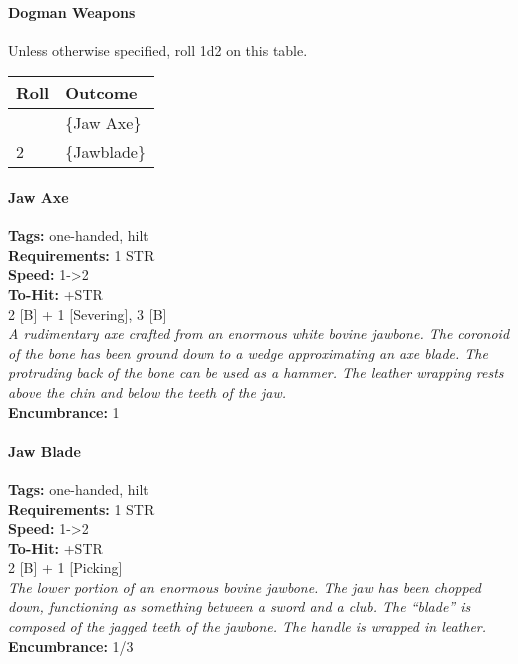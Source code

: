 \documentclass[
  letterpaper,
  DIV=11,
  numbers=noendperiod]{scrartcl}
\let\oldparagraph\paragraph
\renewcommand{\paragraph}[1]{\oldparagraph{#1}\mbox{}}
\begin{document}
\paragraph{Dogman Weapons}\label{dogman-weapons}

Unless otherwise specified, roll 1d2 on this table.

\begin{longtable}[]{@{}ll@{}}
\toprule\noalign{}
Roll & Outcome \\
\midrule\noalign{}
\endhead
\bottomrule\noalign{}
\endlastfoot
1 & \{Jaw Axe\} \\
2 & \{Jawblade\} \\
\end{longtable}

\paragraph{Jaw Axe}\label{jaw-axe}

\textbf{Tags:} one-handed, hilt\\
\textbf{Requirements:} 1 STR\\
\textbf{Speed:} 1-\textgreater2\\
\textbf{To-Hit:} +STR\\
2 {[}B{]} + 1 {[}Severing{]}, 3 {[}B{]}\\
\emph{A rudimentary axe crafted from an enormous white bovine jawbone.
The coronoid of the bone has been ground down to a wedge approximating
an axe blade. The protruding back of the bone can be used as a hammer.
The leather wrapping rests above the chin and below the teeth of the
jaw.}\\
\textbf{Encumbrance:} 1

\paragraph{Jaw Blade}\label{jaw-blade}

\textbf{Tags:} one-handed, hilt\\
\textbf{Requirements:} 1 STR\\
\textbf{Speed:} 1-\textgreater2\\
\textbf{To-Hit:} +STR\\
2 {[}B{]} + 1 {[}Picking{]}\\
\emph{The lower portion of an enormous bovine jawbone. The jaw has been
chopped down, functioning as something between a sword and a club. The
``blade'' is composed of the jagged teeth of the jawbone. The handle is
wrapped in leather.}\\
\textbf{Encumbrance:} 1/3
\end{document}
